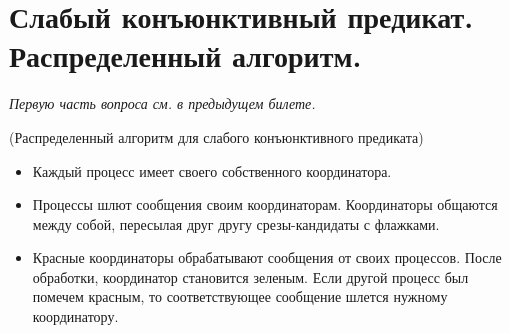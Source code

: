 \section{Слабый конъюнктивный предикат. Распределенный алгоритм.}

\textit{Первую часть вопроса см. в предыдущем билете.}

\begin{algorithm}(Распределенный алгоритм для слабого конъюнктивного предиката)
    \enewline
    \begin{itemize}
        \item Каждый процесс имеет своего собственного координатора.
        \item Процессы шлют сообщения своим координаторам. Координаторы
            общаются между собой, пересылая друг другу срезы-кандидаты
            с флажками.
        \item Красные координаторы обрабатывают сообщения от своих процессов.
            После обработки, координатор становится зеленым. Если другой
            процесс был помечем красным, то соответствующее сообщение
            шлется нужному координатору.
    \end{itemize}
\end{algorithm}

